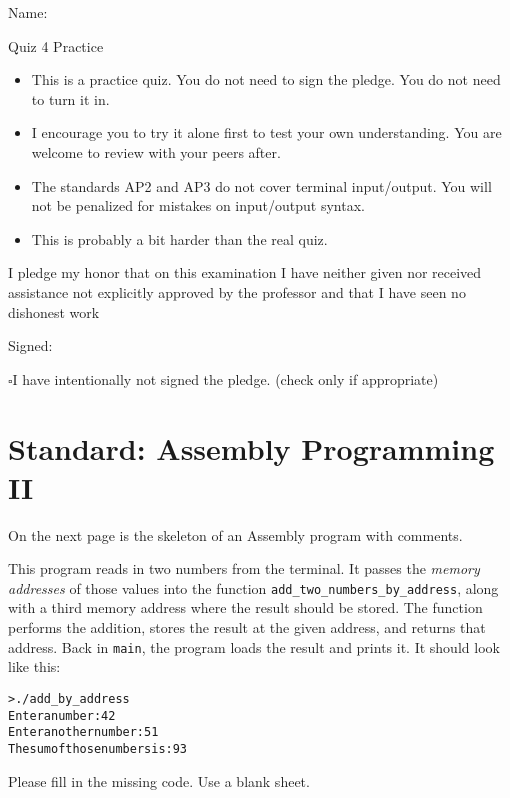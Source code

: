 \documentclass[12pt]{article}
\begin{document}
Name: \makebox[3in]{\hrulefill}

\vfill

\begin{center}
{\huge Quiz 4 Practice}
\end{center}

\begin{itemize}
    \item This is a practice quiz. You do not need to sign the pledge. You do not need to turn it in. 
    \item I encourage you to try it alone first to test your own understanding. You are welcome to review with your peers after.
    \item The standards AP2 and AP3 do not cover terminal input/output. You will not be penalized for mistakes on input/output syntax.
    \item This is probably a bit harder than the real quiz.
\end{itemize}

\vfill

I pledge my honor that on this examination I have neither given nor received assistance not explicitly approved by the professor and that I have seen no dishonest work 

\hfill Signed: \makebox[3in]{\hrulefill}

$\square$\quad I have intentionally not signed the pledge. (check only if appropriate)
\newpage

\section*{Standard: Assembly Programming II}

On the next page is the skeleton of an Assembly program with comments. 

This program reads in two numbers from the terminal. It passes the \textit{memory addresses} of those values into the function \texttt{add\_two\_numbers\_by\_address}, along with a third memory address where the result should be stored. The function performs the addition, stores the result at the given address, and returns that address. Back in \texttt{main}, the program loads the result and prints it. It should look like this:

\begin{alltt}
    > ./add_by_address
    Enter a number: 42
    Enter another number: 51
    The sum of those numbers is: 93
\end{alltt}

Please fill in the missing code. Use a blank sheet.
\end{document}
